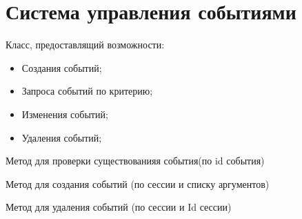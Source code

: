 \documentclass[letterpaper,10pt,english]{sphinxmanual}
\begin{document}
\section{Система управления событиями}
\label{eventManager:id1}\label{eventManager:module-mainServer.eventManager}

\begin{fulllineitems}
\label{eventManager:mainServer.eventManager.EventManager}
Класс, предоставлящий возможности:
\begin{itemize}
\item {} 
Создания событий;

\item {} 
Запроса событий по критерию;

\item {} 
Изменения событий;

\item {} 
Удаления событий;

\end{itemize}

\begin{fulllineitems}
\label{eventManager:mainServer.eventManager.EventManager.checkEvent}
Метод для проверки существованияя события(по id события)

\end{fulllineitems}


\begin{fulllineitems}
\label{eventManager:mainServer.eventManager.EventManager.createEvent}
Метод для создания событий (по сессии и списку аргументов)

\end{fulllineitems}


\begin{fulllineitems}
\label{eventManager:mainServer.eventManager.EventManager.deleteEvent}
Метод для удаления событий (по сессии и Id сессии)


\end{fulllineitems}
\end{fulllineitems}
\end{document}
